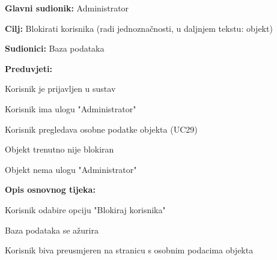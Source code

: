 					\noindent {}
					\begin{packed_item}
	
						\item \textbf{Glavni sudionik: }Administrator
						\item  \textbf{Cilj:} Blokirati korisnika (radi jednoznačnosti, u daljnjem tekstu: objekt)
						\item  \textbf{Sudionici:} Baza podataka
						\item  \textbf{Preduvjeti:}
						\item[] \begin{packed_enum}
							\item Korisnik je prijavljen u sustav
							\item Korisnik ima ulogu "Administrator"
							\item Korisnik pregledava osobne podatke objekta (UC29)
							\item Objekt trenutno nije blokiran
							\item Objekt nema ulogu "Administrator"
						\end{packed_enum}
						\item  \textbf{Opis osnovnog tijeka:}
						
						\item[] \begin{packed_enum}
	
							\item Korisnik odabire opciju "Blokiraj korisnika"
							\item Baza podataka se ažurira
							\item Korisnik biva preusmjeren na stranicu s osobnim podacima objekta
						\end{packed_enum}
						
					\end{packed_item}
					
